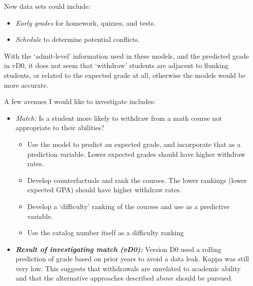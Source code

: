 \documentclass[
]{article}
\providecommand{\tightlist}{%
  \setlength{\itemsep}{0pt}\setlength{\parskip}{0pt}}
\begin{document}
New data sets could include:

\begin{itemize}
\tightlist
\item
  \emph{Early grades} for homework, quizzes, and tests.\\
\item
  \emph{Schedule} to determine potential conflicts.
\end{itemize}

With the `admit-level' information used in these models, and the
predicted grade in vD0, it does not seem that `withdraw' students are
adjacent to flunking students, or related to the expected grade at all,
otherwise the models would be more accurate.

A few avenues I would like to investigate includes:

\begin{itemize}
\tightlist
\item
  \emph{Match:} Is a student more likely to withdraw from a math course
  not appropriate to their abilities?

  \begin{itemize}
  \tightlist
  \item
    Use the model to predict an expected grade, and incorporate that as
    a prediction variable. Lower expected grades should have higher
    withdraw rates.\\
  \item
    Develop counterfactuals and rank the courses. The lower rankings
    (lower expected GPA) should have higher withdraw rates.\\
  \item
    Develop a `difficulty' ranking of the courses and use as a
    predictive variable.
  \item
    Use the catalog number itself as a difficulty ranking\\
  \end{itemize}
\item
  \textbf{\emph{Result of investigating match (vD0):}} Version D0 used a
  rolling prediction of grade based on prior years to avoid a data leak.
  Kappa was still very low. This suggests that withdrawals are unrelated
  to academic ability and that the alternative approaches described
  above should be pursued.


\end{itemize}
\end{document}
